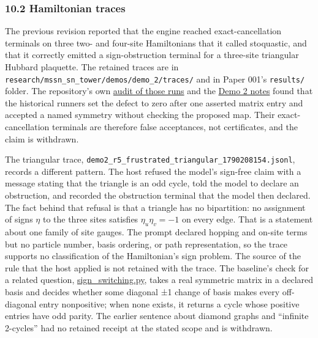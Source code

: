 \documentclass[
  11pt,
]{article}
\newcommand{\passthrough}[1]{#1}
\begin{document}
\hypertarget{hamiltonian-traces}{%
\subsubsection{10.2 Hamiltonian traces}\label{hamiltonian-traces}}

The previous revision reported that the engine reached
exact-cancellation terminals on three two- and four-site Hamiltonians
that it called stoquastic, and that it correctly emitted a
sign-obstruction terminal for a three-site triangular Hubbard plaquette.
The retained traces are in
\nolinkurl{research/mssn_sn_tower/demos/demo_2/traces/} and in Paper
001's \passthrough{\lstinline!results/!} folder. The repository's own
\href{https://github.com/dbccpage/the_symbol_game/blob/52cb5457f6c485ba548cfd292f6012a941ed22cf/research/mssn_sn_tower/demos/anti_morphism_observations.md}{audit
of those runs} and the
\href{https://github.com/dbccpage/the_symbol_game/blob/52cb5457f6c485ba548cfd292f6012a941ed22cf/research/mssn_sn_tower/demos/demo_2/2_demo.md}{Demo
2 notes} found that the historical runners set the defect to zero after
one asserted matrix entry and accepted a named symmetry without checking
the proposed map. Their exact-cancellation terminals are therefore false
acceptances, not certificates, and the claim is withdrawn.

The triangular trace,
\nolinkurl{demo2_r5_frustrated_triangular_1790208154.jsonl}, records a
different pattern. The host refused the model's sign-free claim with a
message stating that the triangle is an odd cycle, told the model to
declare an obstruction, and recorded the obstruction terminal that the
model then declared. The fact behind that refusal is that a triangle has
no bipartition: no assignment of signs \(\eta\) to the three sites
satisfies \(\eta_u\eta_v=-1\) on every edge. That is a statement about
one family of site gauges. The prompt declared hopping and on-site terms
but no particle number, basis ordering, or path representation, so the
trace supports no classification of the Hamiltonian's sign problem. The
source of the rule that the host applied is not retained with the trace.
The baseline's check for a related question,
\href{https://github.com/dbccpage/the_symbol_game/blob/52cb5457f6c485ba548cfd292f6012a941ed22cf/symbol_game/infrastructure/adapters/mssn_research/sign_switching.py}{sign\_switching.py},
takes a real symmetric matrix in a declared basis and decides whether
some diagonal ±1 change of basis makes every off-diagonal entry
nonpositive; when none exists, it returns a cycle whose positive entries
have odd parity. The earlier sentence about diamond graphs and
``infinite 2-cycles'' had no retained receipt at the stated scope and is
withdrawn.
\end{document}
